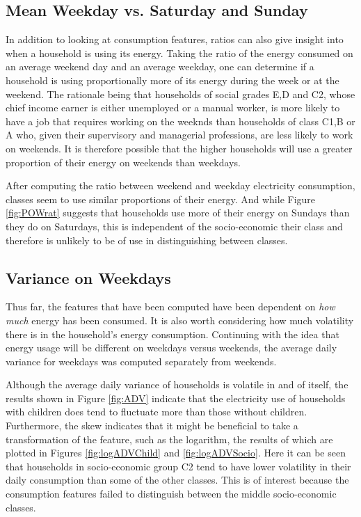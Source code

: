 \subsection*{Mean Weekday vs. Saturday and Sunday}
In addition to looking at consumption features, ratios can also give insight into when a household is using its energy. Taking the ratio of the energy consumed on an average weekend day and an average weekday, one can determine if a household is using proportionally more of its energy during the week or at the weekend. The rationale being that households of social grades E,D and C2, whose chief income earner is either unemployed or a manual worker, is more likely to have a job that requires working on the weeknds than households of class C1,B or A who, given their supervisory and managerial professions, are less likely to work on weekends. It is therefore possible that the higher households will use a greater proportion of their energy on weekends than weekdays. 
\POWrat

After computing the ratio between weekend and weekday electricity consumption, classes seem to use similar proportions of their energy. And while Figure \ref{fig:POWrat} suggests that households use more of their energy on Sundays than they do on Saturdays, this is independent of the socio-economic their class and therefore is unlikely to be of use in distinguishing between classes.


\subsection*{Variance on Weekdays}
Thus far, the features that have been computed have been dependent on \textit{how much} energy has been consumed. It is also worth considering how much volatility there is in the household's energy consumption. Continuing with the idea that energy usage will be different on weekdays versus weekends, the average daily variance for weekdays was computed separately from weekends. 

\ADV

Although the average daily variance of households is volatile in and of itself, the results shown in Figure \ref{fig:ADV} indicate that the electricity use of households with children does tend to fluctuate more than those without children. Furthermore, the skew indicates that it might be beneficial to take a transformation of the feature, such as the logarithm, the results of which are plotted in Figures \ref{fig:logADVChild} and \ref{fig:logADVSocio}. Here it can be seen that households in socio-economic group C2 tend to have lower volatility in their daily consumption than some of the other classes. This is of interest because the consumption features failed to distinguish between the middle socio-economic classes.

